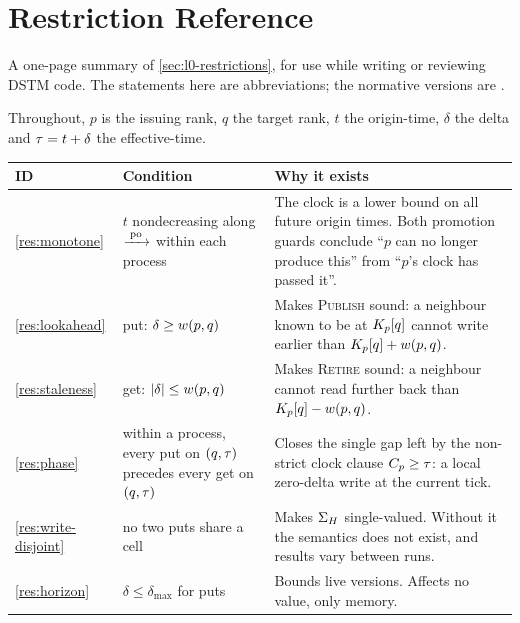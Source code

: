 \chapter{Restriction Reference}
\label{ch:restrictions}

A one-page summary of \cref{sec:l0-restrictions}, for use while writing or
reviewing DSTM code. The statements here are abbreviations; the normative
\glspl{version} are .

Throughout, $p$ is the issuing \gls{rank}, $q$ the target \gls{rank}, $t$ the \gls{origin-time},
$\delta$ the \gls{delta} and $\tau = t + \delta$ the \gls{effective-time}.

\begin{table}[htbp]
\centering
\small
\renewcommand{\arraystretch}{1.35}
\begin{tabularx}{\textwidth}{@{}l >{\raggedright\arraybackslash}p{4.3cm}
                                 >{\raggedright\arraybackslash}X@{}}
\toprule
\textbf{ID} & \textbf{Condition} & \textbf{Why it exists} \\
\midrule

\cref{res:monotone}
 & $t$ nondecreasing along $\xrightarrow{\;\mathrm{po}\;}$ within each process
 & The clock is a lower bound on all future origin times. Both promotion
   guards conclude ``$p$ can no longer produce this'' from ``$p$'s clock has
   passed it''. \\

\cref{res:lookahead}
 & put: $\delta \ge w(p,q)$
 & Makes \textsc{Publish} sound: a neighbour known to be at $K_{p}[q]$ cannot
   write earlier than $K_{p}[q] + w(p,q)$. \\

\cref{res:staleness}
 & get: $|\delta| \le w(p,q)$
 & Makes \textsc{Retire} sound: a neighbour cannot read further back than
   $K_{p}[q] - w(p,q)$. \\

\cref{res:phase}
 & within a process, every put on $(q,\tau)$ precedes every get on $(q,\tau)$
 & Closes the single gap left by the non-strict clock clause $C_{p} \ge
   \tau$: a local zero-delta write at the current tick. \\

\cref{res:write-disjoint}
 & no two puts share a cell
 & Makes $\Sigma_{H}$ single-valued. Without it the semantics does not exist,
   and results vary between runs. \\

\cref{res:horizon}
 & $\delta \le \delta_{\max}$ for puts
 & Bounds live versions. Affects no value, only memory. \\


\end{tabularx}
\end{table}
